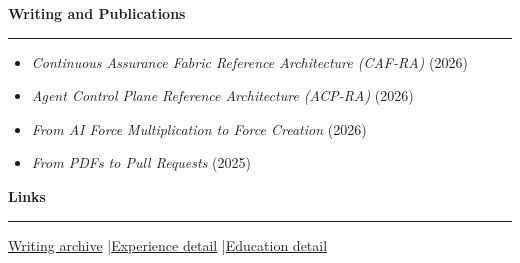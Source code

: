 \documentclass[10pt]{article}
\newcommand{\ResumeSection}[1]{\vspace{0.4em}\textbf{\large #1}\par\vspace{0.2em}\textcolor{accentgold}{\rule{\textwidth}{0.7pt}}\vspace{0.2em}}
\begin{document}
\ResumeSection{Writing and Publications}
\begin{itemize}
  \item \textit{Continuous Assurance Fabric Reference Architecture (CAF-RA)} (2026)
  \item \textit{Agent Control Plane Reference Architecture (ACP-RA)} (2026)
  \item \textit{From AI Force Multiplication to Force Creation} (2026)
  \item \textit{From PDFs to Pull Requests} (2025)
\end{itemize}

\ResumeSection{Links}
\href{https://www.adamboas.com/writing/}{Writing archive} \quad|\quad \href{https://www.adamboas.com/experience/}{Experience detail} \quad|\quad \href{https://www.adamboas.com/education/}{Education detail}
\end{document}
